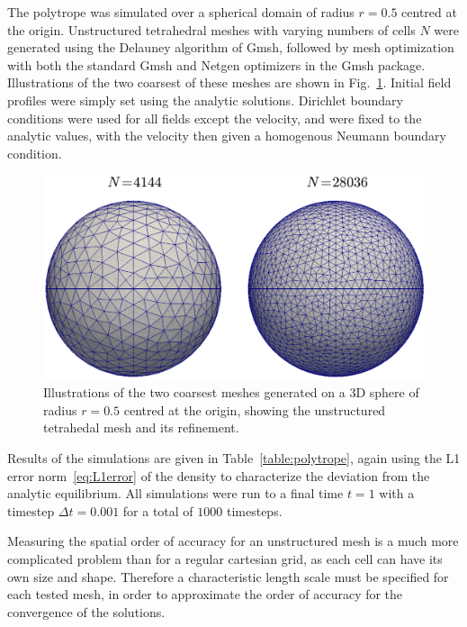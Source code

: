 The polytrope was simulated over a spherical domain of radius $r=0.5$ centred at the origin. Unstructured tetrahedral meshes with varying numbers of cells $N$ were generated using the Delauney algorithm of Gmsh, followed by mesh optimization with both the standard Gmsh and Netgen optimizers in the Gmsh package. Illustrations of the two coarsest of these meshes are shown in Fig.~\ref{fig:sphere_meshes}. Initial field profiles were simply set using the analytic solutions. Dirichlet boundary conditions were used for all fields except the velocity, and were fixed to the analytic values, with the velocity then given a homogenous Neumann boundary condition.

\begin {figure}
\centering
\includegraphics[width=13cm]{figures/sphere_meshes}
\caption {Illustrations of the two coarsest meshes generated on a 3D sphere of radius $r=0.5$ centred at the origin, showing the unstructured tetrahedal mesh and its refinement.}
\label{fig:sphere_meshes}
\end{figure}

Results of the simulations are given in Table~\ref{table:polytrope}, again using the L1 error norm~\eqref{eq:L1error} of the density to characterize the deviation from the analytic equilibrium. All simulations were run to a final time $t=1$ with a timestep $\Delta t=0.001$ for a total of $1000$ timesteps.

Measuring the spatial order of accuracy for an unstructured mesh is a much more complicated problem than for a regular cartesian grid, as each cell can have its own size and shape. Therefore a characteristic length scale must be specified for each tested mesh, in order to approximate the order of accuracy for the convergence of the solutions.

